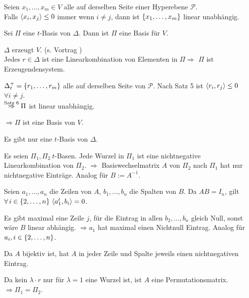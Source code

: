 \documentclass{handout}
\begin{document}
\begin{satz}
    Seien \( x_1, \ldots, x_m \in V \) alle auf derselben 
    Seite einer Hyperebene \( \mathscr{P} \). \\
    Falls \( \langle x_i, x_j \rangle \leq 0 \) immer wenn 
    \( i \neq j \), dann ist \( \{x_1, \ldots, x_m\} \) 
    linear unabhängig.
\end{satz} 

\begin{satz}
    Sei \( \Pi \) eine \(t\)-Basis von \( \Delta \). Dann ist 
    \( \Pi \) eine Basis für \( V \).
\end{satz}
\begin{bew}
    \( \Delta \) erzeugt \( V \). (s. Vortrag )\\
    Jedes \( r \in \Delta \) ist eine Linearkombination von 
    Elementen in \( \Pi \Rightarrow \) \( \Pi \) ist Erzeugendensystem.

    \( \Delta_t^+ = \{r_1, \ldots, r_m\} \) alle auf derselben Seite 
    von \( \mathscr{P} \). Nach Satz 5 ist \( \langle r_i, r_j \rangle \leq 0 \)
    \( \forall i \neq j \). \\\( \overset{\text{Satz 6}}{\Rightarrow} \Pi \) 
    ist linear unabhängig.

    \( \Rightarrow \Pi \) ist eine Basis von \(V\).
\end{bew}

\begin{satz}
    Es gibt nur eine \( t \)-Basis von \( \Delta \).
\end{satz}
\begin{bew}
    Es seien \( \Pi_1, \Pi_2\ t \)-Basen. Jede Wurzel in \( \Pi_1 \) ist eine nichtnegative 
    Linearkombination von \( \Pi_2 \). \( \Rightarrow \) Basiswechselmatrix \(A\) von 
    \( \Pi_2 \) nach \( \Pi_1 \) hat nur nichtnegative Einträge. Analog für \( B := A^{-1} \).

    Seien \( a_1, \ldots, a_n \) die Zeilen von \(A\), \( b_1, \ldots, b_n \) die Spalten von \(B\).
    Da \( AB = I_n \), gilt \( \forall i \in \set{2, \ldots, n}\ \scalarprod{a_1^t}{b_i} = 0 \).

    Es gibt maximal eine Zeile \( j \), für die Eintrag in allen 
    \( b_2, \ldots, b_n \) gleich Null, sonst wäre 
    \(B\) linear abhängig. \( \Rightarrow a_1 \) hat maximal einen 
    Nichtnull Eintrag. Analog für \( a_i, i \in \{2, \ldots, n\} \).

    Da \(A\) bijektiv ist, hat \(A\) in jeder Zeile und 
    Spalte jeweils einen nichtnegativen Eintrag.

    Da kein \( \lambda \cdot r \) nur für 
    \( \lambda = 1 \) eine Wurzel ist, 
    ist \( A \) eine Permutationsmatrix.
    \( \Rightarrow \Pi_1 = \Pi_2 \).
\end{bew}
\end{document}
